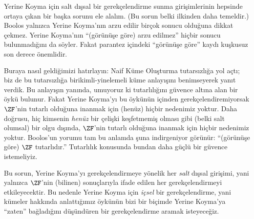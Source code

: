 Yerine Koyma için salt dışsal bir gerekçelendirme sunma girişimlerinin
hepsinde ortaya çıkan bir başka sorunu ele alalım. (Bu sorun belki ilkinden
daha temeldir.) Boolos yalnızca Yerine Koyma'nın arzu edilir birçok sonucu
olduğuna dikkat çekmez. Yerine Koyma'nın ``(görünüşe göre) arzu edilmez''
hiçbir sonucu bulunmadığını da söyler. Fakat parantez içindeki ``görünüşe
göre'' kaydı kuşkusuz son derece önemlidir.

Buraya nasıl geldiğimizi hatırlayın: Naif Küme Oluşturma tutarsızlığa yol
açtı; biz de bu tutarsızlığa birikimli-yinelemeli küme anlayışını benimseyerek
yanıt verdik. Bu anlayışın yanında, umuyoruz ki tutarlılığını güvence altına
alan bir öykü bulunur. Fakat Yerine Koyma'yı bu öykünün içinden
gerekçelendiremiyorsak $\ZF$'nin tutarlı olduğuna inanmak için (henüz) hiçbir
nedenimiz yoktur. Daha doğrusu, hiç kimsenin \emph{henüz} bir çelişki
keşfetmemiş olması gibi (belki salt olumsal) bir olgu dışında, $\ZF$'nin
tutarlı olduğuna inanmak için hiçbir nedenimiz yoktur. Boolos'un yorumu tam
bu anlamda şuna indirgeniyor görünür: ``(görünüşe göre) $\ZF$ tutarlıdır.''
Tutarlılık konusunda bundan daha güçlü bir güvence istemeliyiz.

Bu sorun, Yerine Koyma'yı gerekçelendirmeye yönelik her \emph{salt} dışsal
girişimi, yani yalnızca $\ZF$'nin (bilinen) sonuçlarıyla ifade edilen her
gerekçelendirmeyi etkileyecektir. Bu nedenle Yerine Koyma için \emph{içsel}
bir gerekçelendirme, yani kümeler hakkında anlattığımız öykünün bizi bir
biçimde Yerine Koyma'ya ``zaten'' bağladığını düşündüren bir gerekçelendirme
aramak isteyeceğiz.

